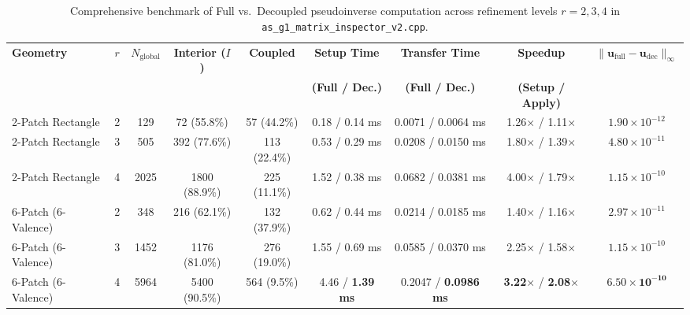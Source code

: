 \documentclass[11pt,a4paper]{article}
\begin{document}
\begin{table}[htbp]
\centering
\caption{Comprehensive benchmark of Full vs.\ Decoupled pseudoinverse computation across refinement levels $r=2,3,4$ in \texttt{as\_g1\_matrix\_inspector\_v2.cpp}.}
\label{tab:benchmarks}
\vspace{0.2cm}
\small
\begin{tabular}{lcccccccc}
\toprule
\textbf{Geometry} & $r$ & $N_{\text{global}}$ & \textbf{Interior ($I$)} & \textbf{Coupled} & \textbf{Setup Time} & \textbf{Transfer Time} & \textbf{Speedup} & $\|\mathbf{u}_{\text{full}} - \mathbf{u}_{\text{dec}}\|_\infty$ \\
 & & & & & \textbf{(Full / Dec.)} & \textbf{(Full / Dec.)} & \textbf{(Setup / Apply)} & \\
\midrule
2-Patch Rectangle & 2 & 129 & 72 (55.8\%) & 57 (44.2\%) & 0.18 / 0.14 ms & 0.0071 / 0.0064 ms & 1.26$\times$ / 1.11$\times$ & $1.90 \times 10^{-12}$ \\
2-Patch Rectangle & 3 & 505 & 392 (77.6\%) & 113 (22.4\%) & 0.53 / 0.29 ms & 0.0208 / 0.0150 ms & 1.80$\times$ / 1.39$\times$ & $4.80 \times 10^{-11}$ \\
2-Patch Rectangle & 4 & 2025 & 1800 (88.9\%) & 225 (11.1\%) & 1.52 / 0.38 ms & 0.0682 / 0.0381 ms & 4.00$\times$ / 1.79$\times$ & $1.15 \times 10^{-10}$ \\
\midrule
6-Patch (6-Valence) & 2 & 348 & 216 (62.1\%) & 132 (37.9\%) & 0.62 / 0.44 ms & 0.0214 / 0.0185 ms & 1.40$\times$ / 1.16$\times$ & $2.97 \times 10^{-11}$ \\
6-Patch (6-Valence) & 3 & 1452 & 1176 (81.0\%) & 276 (19.0\%) & 1.55 / 0.69 ms & 0.0585 / 0.0370 ms & 2.25$\times$ / 1.58$\times$ & $1.15 \times 10^{-10}$ \\
6-Patch (6-Valence) & 4 & 5964 & 5400 (90.5\%) & 564 (9.5\%) & 4.46 / \textbf{1.39 ms} & 0.2047 / \textbf{0.0986 ms} & \textbf{3.22$\times$} / \textbf{2.08$\times$} & $\mathbf{6.50 \times 10^{-10}}$ \\
\bottomrule
\end{tabular}
\end{table}
\end{document}

